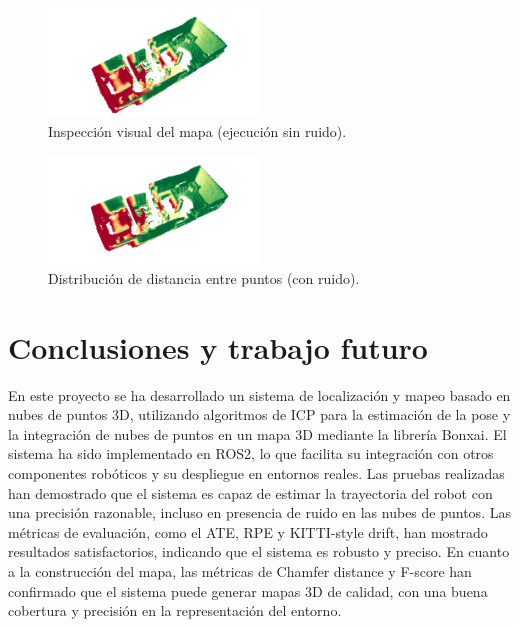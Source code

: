 \documentclass[12pt, a4paper, twoside]{article}
\begin{document}
\begin{figure}[h]
  \centering
    \includegraphics[width=0.5\textwidth]{map_clean.png}
  \caption{Inspección visual del mapa (ejecución sin ruido).}
\end{figure} 

\begin{figure}[h]
  \centering
    \includegraphics[width=0.5\textwidth]{map_noisy.png}
  \caption{Distribución de distancia entre puntos (con ruido).}
\end{figure} 

\section{Conclusiones y trabajo futuro}
En este proyecto se ha desarrollado un sistema de localización y mapeo basado en nubes de puntos 3D, utilizando algoritmos de ICP para la estimación de la pose y la integración de nubes de puntos en un mapa 
3D mediante la librería Bonxai. El sistema ha sido implementado en ROS2\cite{doi:10.1126/scirobotics.abm6074}, lo que facilita su integración con otros componentes robóticos y su despliegue en entornos reales.\newline
Las pruebas realizadas han demostrado que el sistema es capaz de estimar la trayectoria del robot con una precisión razonable, incluso en presencia de ruido en las nubes de puntos. Las métricas de
evaluación, como el ATE\cite{Chen2022DELOATE}, RPE\cite{Sturm2012RPE} y KITTI-style drift\cite{Geiger2013KITTI}, han mostrado resultados satisfactorios, indicando que el sistema es robusto y preciso.\newline
En cuanto a la construcción del mapa, las métricas de Chamfer\cite{Fan2020Chamfer} distance y F-score\cite{Caccia2018FScore} han confirmado que el sistema puede generar mapas 3D de calidad, con una buena cobertura y precisión en la 
representación del entorno.\newline
\end{document}
